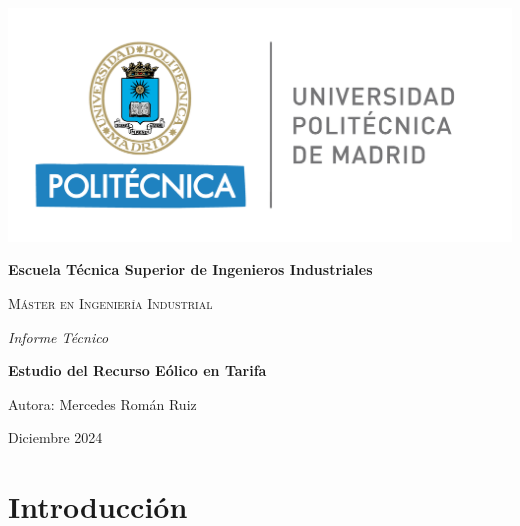 \documentclass{IEEEtran}
\def\TituloProyecto{Estudio del Recurso Eólico en Tarifa}
\def\Asignatura{Fuentes de Energía}
\def\Curso{2024 - 25}
\def\Fecha{Diciembre 2024}
\begin{document}
\sloppy 
\setlength{\parindent}{30pt}
\setlength{\parskip}{6pt}
\renewcommand\thesection{\arabic{section}}
\renewcommand{\baselinestretch}{1.5}

\fancyhead{}
\fancyfoot{}
\chead[\rightmark]{\leftmark}

\fancyfoot[LE,RO]{\thepage}

\begin{titlepage}
    \centering
    \includegraphics[width=0.5\linewidth]{Imagenes/Logo UPM.png} \par
    \vspace{1cm}
    {\bfseries\LARGE Escuela Técnica Superior de Ingenieros Industriales \par}
    \vspace{0.5cm}
    {\scshape\Large Máster en Ingeniería Industrial \par}
    \vspace{3 cm}
    {\itshape\huge Informe Técnico \par}
    \vspace{0.5cm}
    {\Huge \textbf{\TituloProyecto} \par}
    \vfill
    {\Large Autora: Mercedes Román Ruiz \par}
    \vspace{0.5cm}
    {\Large \Fecha \par}
\end{titlepage}

\tableofcontents

\section{Introducción}
\end{document}
